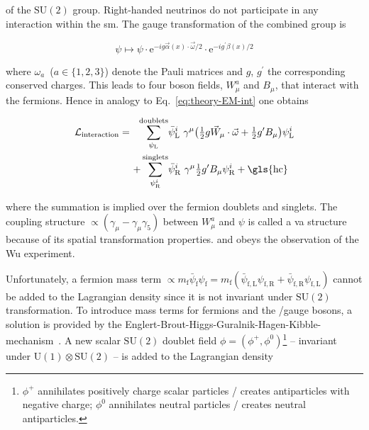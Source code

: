 of the $\mathrm{SU(2)}$ group. Right-handed neutrinos do not participate in any interaction within the \gls{sm}. The gauge transformation of the combined group is

\begin{equation}
\psi\mapsto\psi\cdot\mathrm{e}^{-ig\vec{\alpha}(x)\cdot\vec{\omega}/2}\cdot\mathrm{e}^{-ig^{\prime}\beta(x)/2} \label{eq:theory-u1su2-transformation}
\end{equation}

where $\omega_{a}$~($a\in\{1,2,3\}$) denote the Pauli matrices and $g$, $g^{\prime}$ the corresponding conserved charges. This leads to four boson fields, $W^{a}_{\mu}$ and $B_{\mu}$, that interact with the fermions. Hence in analogy to Eq.~\ref{eq:theory-EM-int} one obtains

\begin{align}
\mathcal{L}_\mathrm{interaction}=~~\sum_{\psi_\mathrm{L}}^\mathrm{doublets}&\bar{\psi}^{i}_\mathrm{L}~\gamma^{\mu}\big(\tfrac{1}{2}g\vec{W}_{\mu}\cdot\vec{\omega}+\tfrac{1}{2}g^{\prime}B_{\mu}\big)\psi^{i}_\mathrm{L} \\
+\sum_{\psi^{i}_\mathrm{R}}^\mathrm{singlets}&\bar{\psi}^{i}_\mathrm{R}~\gamma^{\mu}\tfrac{1}{2}g^{\prime}B_{\mu}\psi^{i}_\mathrm{R} + \mathrm{\gls{hc}}
\end{align}

where the summation is implied over the fermion doublets and singlets. The coupling structure $\propto(\gamma_{\mu}-\gamma_{\mu}\gamma_{5})$ between $W_{\mu}^{a}$ and $\psi$ is called a \gls{va} structure because of its spatial transformation properties.  and obeys the observation of the Wu experiment.

Unfortunately, a fermion mass term $\propto m_\mathrm{f}\bar{\psi}_\mathrm{f}\psi_\mathrm{f}=m_\mathrm{f}(\bar{\psi}_\mathrm{f,L}\psi_\mathrm{f,R}+\bar{\psi}_\mathrm{f,R}\psi_\mathrm{f,L})$ cannot be added to the Lagrangian density since it is not invariant under $\mathrm{SU(2)}$ transformation. To introduce mass terms for fermions and the \wboson/\zboson gauge bosons, a solution is provided by the Englert-Brout-Higgs-Guralnik-Hagen-Kibble-mechanism~\cite{HIGGS1964132,PhysRevLett.13.508,PhysRevLett.13.321,PhysRevLett.13.585}. A new scalar $\mathrm{SU(2)}$ doublet field $\phi=(\phi^{+},\phi^{0})$\footnote{$\phi^{+}$ annihilates positively charge scalar particles / creates antiparticles with negative charge; $\phi^{0}$ annihilates neutral particles / creates neutral antiparticles.} -- invariant under $\mathrm{U(1)}\otimes\mathrm{SU(2)}$ -- is added to the Lagrangian density

